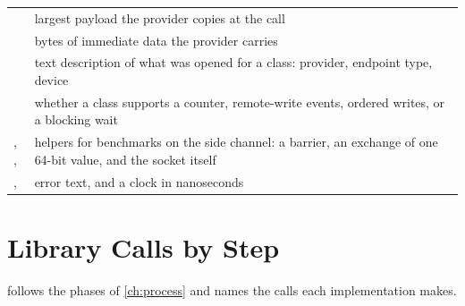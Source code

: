 \begin{tightblock}
\begin{longtable}{L{4.1cm}L{10.3cm}}
   & largest payload the provider copies at the call \\
   & bytes of immediate data the provider carries \\
   & text description of what was opened for a class: provider, endpoint type, device \\
   & whether a class supports a counter, remote-write events, ordered writes, or a blocking wait \\
  , ,  & helpers for benchmarks on the side channel: a barrier, an exchange of one 64-bit value, and the socket itself \\
  ,  & error text, and a clock in nanoseconds \\
  \bottomrule
\end{longtable}
\end{tightblock}

\section{Library Calls by Step}

 follows the phases of \cref{ch:process} and names the calls
each implementation makes.

